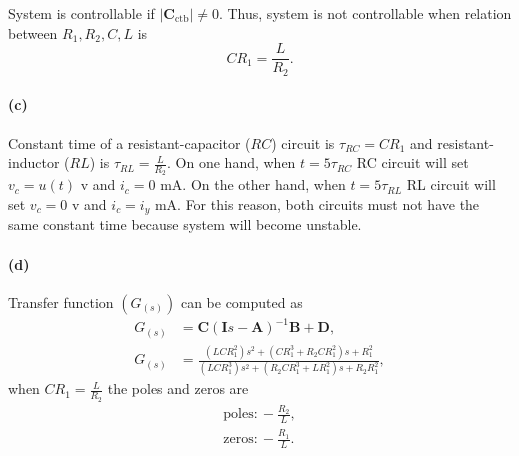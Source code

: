 System is controllable if $|\mathbf{C_{\mathrm{ctb}}}| \ne 0$. Thus, system is not controllable when relation between $R_1, R_2, C, L$ is
\begin{equation*}
	C R_1 = \frac{L}{R_2}.
\end{equation*}

\paragraph{(c)} Constant time of a resistant-capacitor ($RC$) circuit is $\tau_{RC}= C R_1$ and resistant-inductor ($RL$) is $\tau_{RL}=\frac{L}{R_2}$. On one hand, when $t=5\tau_{RC}$ RC circuit will set $v_c = u(t)$ v and $i_c = 0$ mA. On the other hand,  when $t=5\tau_{RL}$ RL circuit will set $v_c = 0$ v and $i_c = i_y$ mA. For this reason, both circuits must not have the same constant time because system will become unstable.

\paragraph{(d)} Transfer function $(G_{(s)})$ can be computed as
\begin{align}
	G_{(s)}&=\mathbf{C}(\mathbf{I}s-\mathbf{A})^{-1}\mathbf{B} + \mathbf{D}, \nonumber \\
	G_{(s)}&= \frac{(L C R^2_1)s^2 + (C R^3_1 + R_2 C R^2_1)s + R^2_1}{(L C R^3_1)s^2 + (R_2 C R^3_1 + L R^2_1)s + R_2 R^2_1},
	\label{eq:2d_G}
\end{align}
when $C R_1 = \frac{L}{R_2}$ the poles and zeros are
\begin{align*}
\mathrm{poles:} -\frac{R_2}{L}, \\
\mathrm{zeros:} -\frac{R_1}{L}.
\end{align*}















